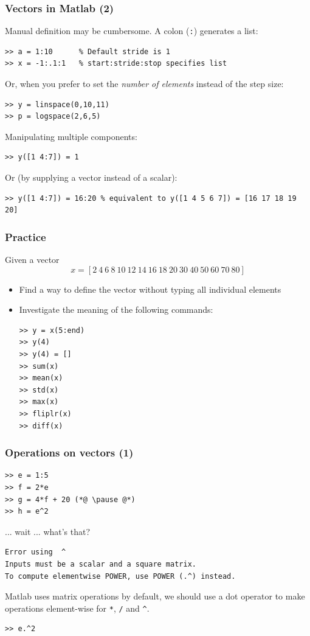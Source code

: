 \documentclass[11pt,table,final,fleqn,xcolor={usenames,dvipsnames},unknownkeysallowed,handout]{beamer}
\begin{document}
\begin{frame}[fragile]
  \frametitle{Vectors in Matlab (2)}
  Manual definition may be cumbersome. A colon (\lstinline$:$) generates a list:
  \begin{lstlisting}
>> a = 1:10      % Default stride is 1
>> x = -1:.1:1   % start:stride:stop specifies list
  \end{lstlisting}\pause
  Or, when you prefer to set the \emph{number of elements} instead of the step size:
  \begin{lstlisting}
>> y = linspace(0,10,11)
>> p = logspace(2,6,5)
  \end{lstlisting}\pause
  Manipulating multiple components:
  \begin{lstlisting}
>> y([1 4:7]) = 1
  \end{lstlisting}\pause
  Or (by supplying a vector instead of a scalar):
  \begin{lstlisting}
>> y([1 4:7]) = 16:20 % equivalent to y([1 4 5 6 7]) = [16 17 18 19 20]
  \end{lstlisting}
\end{frame}

\begin{frame}[fragile]
 \frametitle{Practice}
 Given a vector 
 \[ 
    x = \left[2 \ 4 \ 6 \ 8 \ 10 \ 12 \ 14 \ 16 \ 18 \ 20 \ 30 \ 40 \ 50 \ 60 \ 70 \ 80 \right]
 \]
 \begin{itemize}
  \item Find a way to define the vector without typing all individual elements\pause
  \item Investigate the meaning of the following commands:
  \begin{lstlisting}
>> y = x(5:end)
>> y(4)
>> y(4) = []
>> sum(x)
>> mean(x)
>> std(x)
>> max(x)
>> fliplr(x)
>> diff(x)
  \end{lstlisting}
 \end{itemize}
\end{frame}

\begin{frame}[fragile]
  \frametitle{Operations on vectors (1)}
  \begin{lstlisting}
>> e = 1:5
>> f = 2*e
>> g = 4*f + 20 (*@ \pause @*)
>> h = e^2
  \end{lstlisting}\pause
  ... wait ... what's that?
  \begin{lstlisting}[basicstyle=\color{red}\footnotesize\ttfamily,keywordstyle={\color{red}}, identifierstyle=\color{red}]
Error using  ^ 
Inputs must be a scalar and a square matrix.
To compute elementwise POWER, use POWER (.^) instead.
  \end{lstlisting}\pause
  Matlab uses matrix operations by default, we should use a dot operator to make operations element-wise for \lstinline$*$, \lstinline$/$ and \lstinline$^$.
  \begin{lstlisting}
>> e.^2
  \end{lstlisting}
\end{frame}
\end{document}
